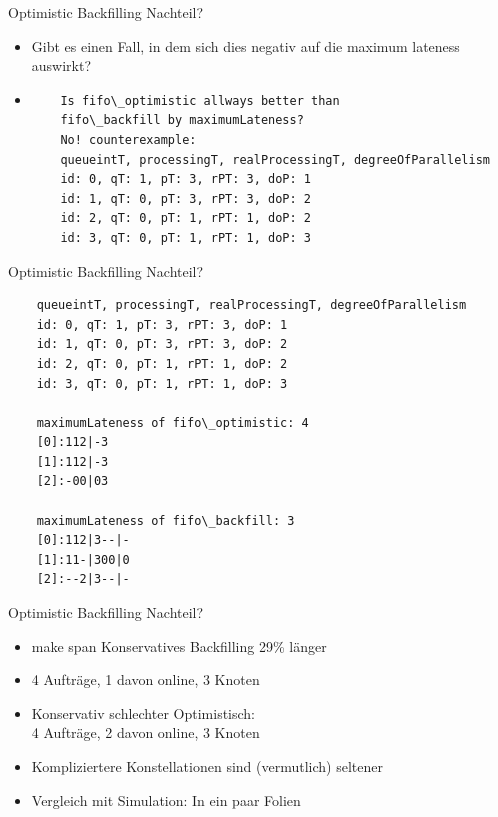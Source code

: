 \documentclass[aspectratio=169,10pt]{beamer}
\begin{document}
\begin{frame}[t,fragile]{Optimistic Backfilling Nachteil?}
\begin{itemize}[<+->]
	\item Gibt es einen Fall, in dem sich dies negativ auf die maximum lateness auswirkt?
	\item \begin{verbatim}
	Is fifo\_optimistic allways better than
	fifo\_backfill by maximumLateness?
	No! counterexample:
	queueintT, processingT, realProcessingT, degreeOfParallelism
	id: 0, qT: 1, pT: 3, rPT: 3, doP: 1
	id: 1, qT: 0, pT: 3, rPT: 3, doP: 2
	id: 2, qT: 0, pT: 1, rPT: 1, doP: 2
	id: 3, qT: 0, pT: 1, rPT: 1, doP: 3
	\end{verbatim}
\end{itemize}
\end{frame}

\begin{frame}[t,fragile]{Optimistic Backfilling Nachteil?}
\small
\begin{verbatim}	
	queueintT, processingT, realProcessingT, degreeOfParallelism
	id: 0, qT: 1, pT: 3, rPT: 3, doP: 1
	id: 1, qT: 0, pT: 3, rPT: 3, doP: 2
	id: 2, qT: 0, pT: 1, rPT: 1, doP: 2
	id: 3, qT: 0, pT: 1, rPT: 1, doP: 3

	maximumLateness of fifo\_optimistic: 4
	[0]:112|-3
	[1]:112|-3
	[2]:-00|03
	
	maximumLateness of fifo\_backfill: 3
	[0]:112|3--|-
	[1]:11-|300|0
	[2]:--2|3--|-
\end{verbatim}
\end{frame}

\begin{frame}[t,fragile]{Optimistic Backfilling Nachteil?}
	\begin{itemize}[<+->]
		\item make span Konservatives Backfilling 29\% l\"anger
		\item 4 Auftr\"age, 1 davon online, 3 Knoten
		\item Konservativ schlechter Optimistisch:\\
		4 Auftr\"age, 2 davon online, 3 Knoten
		\item Kompliziertere Konstellationen sind (vermutlich) seltener
		\item Vergleich mit Simulation: In ein paar Folien
	\end{itemize} 
\end{frame}
\end{document}
